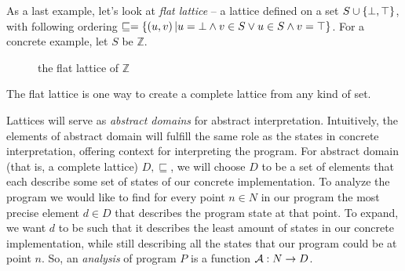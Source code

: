 \documentclass[..thesis.tex]{subfiles}
\begin{document}
As a last example, let's look at \textit{flat lattice} -- a lattice defined on a set $S \cup \left\lbrace \bot, \top \right\rbrace$, with following ordering $\sqsubseteq = \left\lbrace \left(  u,v \right)  | u = \bot \land v \in S \lor  u \in S \land  v = \top \right\rbrace$. For a concrete example, let $S$ be $\mathbb{Z}$.

\begin{figure}[H]
  \begin{center}
  \end{center}
  \caption{the flat lattice of $\mathbb{Z}$ }
\end{figure}

The flat lattice is one way to create a complete lattice from any kind of set.


Lattices will serve as \textit{abstract domains} for abstract interpretation. Intuitively, the elements of abstract domain will fulfill the same role as the states in concrete interpretation, offering context for interpreting the program. For abstract domain (that is, a complete lattice) $D,\sqsubseteq$, we will choose $D$ to be a set of elements that each describe some set of states of our concrete implementation. To analyze the program we would like to find for every point $n \in N$ in our program the most precise element $d \in D$ that describes the program state at that point. To expand, we want $d$ to be such that it describes the least amount of states in our concrete implementation, while still describing all the states that our program could be at point $n$. So, an \textit{analysis} of program $P$ is a function $\mathcal{A} : N \to D$.
\end{document}
